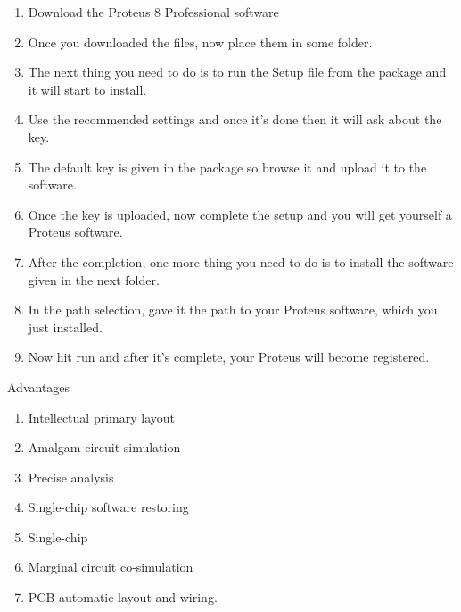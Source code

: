 \documentclass[12pt,a4paper]{report}
\begin{document}
\begin{enumerate}
\item  Download the Proteus 8 Professional software

\item  Once you downloaded the files, now place them in some folder.

\item  The next thing you need to do is to run the Setup file from the package and it will start to install.

\item  Use the recommended settings and once it's done then it will ask about the key.

\item  The default key is given in the package so browse it and upload it to the software.

\item  Once the key is uploaded, now complete the setup and you will get yourself a Proteus software.

\item  After the completion, one more thing you need to do is to install the software given in the next folder.

\item  In the path selection, gave it the path to your Proteus software, which you just installed.

\item  Now hit run and after it's complete, your Proteus will become registered.
\end{enumerate}

\noindent Advantages 

\begin{enumerate}
\item  Intellectual primary layout 

\item  Amalgam circuit simulation 

\item  Precise analysis

\item  Single-chip software restoring

\item  Single-chip 

\item  Marginal circuit co-simulation

\item  PCB automatic layout and wiring.
\end{enumerate}
\end{document}

